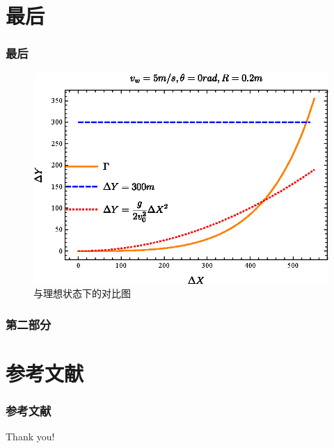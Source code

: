 \documentclass[16pt]{beamer}
\begin{document}
\section{最后}
	\begin{frame}
		\frametitle{最后}
		\begin{figure}[H]
			\centering
			\includegraphics[width=0.6\linewidth]{figure/hlx-q1.eps}
			\caption{与理想状态下的对比图}
			\label{fig:hlx-q1}
		\end{figure}
	\end{frame}
	
	\begin{frame}
		\frametitle{第二部分}
	\end{frame}
	
\section{参考文献}
	\begin{frame}
		\frametitle{参考文献}
		
	\end{frame}
	\begin{frame}
		\Huge{\centerline{Thank you!}}
	\end{frame}
	
\end{document}
